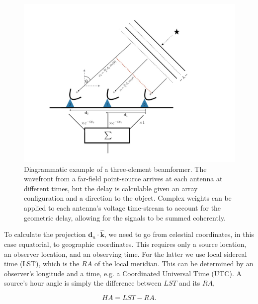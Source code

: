 \begin{figure}[!h]
\begin{center}
\includegraphics[trim={1.in, 1.in, 2.5in, 1.in}, width=1\textwidth]{./figures/beamforming/beamforming_diagram.jpeg} 
\vspace{0.0cm}
\caption[abc]{Diagrammatic example of a three-element beamformer. The 
wavefront from a far-field point-source arrives at each antenna 
at different times, but the delay is calculable given an array 
configuration and a direction to the object. Complex weights can 
be applied to each antenna's voltage time-stream to account 
for the geometric delay, allowing for the signals to be summed coherently.}
\label{fig-bf_diagram}  
\vspace{-0.4cm}   
\end{center}
\end{figure}

To calculate the projection $\mathbf{d}_n \cdot  {\mathbf{\hat{k}}}$, we 
need to go from celestial coordinates, in this case equatorial, to geographic 
coordinates. This requires only a source location, an observer location, and an 
observing time. For the latter we use local 
sidereal time (LST), which is the $RA$ of the local meridian. This can be determined  
by an observer's longitude and a time, e.g. a Coordinated Universal Time (UTC). 
A source's hour angle is simply the difference between $LST$ and its $RA$,

\begin{equation}
HA = LST - RA.
\end{equation}

